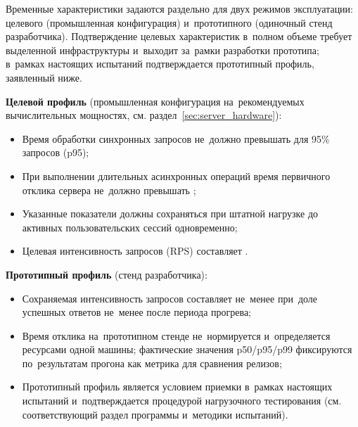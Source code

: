 \documentclass[12pt,a4paper]{extarticle}
\begin{document}
\begin{hseExample}
Временные характеристики задаются раздельно для двух режимов эксплуатации: целевого (промышленная конфигурация) и~прототипного (одиночный стенд разработчика). Подтверждение целевых характеристик в~полном объеме требует выделенной инфраструктуры и~выходит за~рамки разработки прототипа; в~рамках настоящих испытаний подтверждается прототипный профиль, заявленный ниже.

\textbf{Целевой профиль} (промышленная конфигурация на~рекомендуемых вычислительных мощностях, см. раздел~\ref{sec:server_hardware}):
\begin{itemize}[leftmargin=1.25cm]
    \item Время обработки синхронных запросов не~должно превышать  для 95\% запросов (p95);
    \item При выполнении длительных асинхронных операций время первичного отклика сервера не~должно превышать ;
    \item Указанные показатели должны сохраняться при штатной нагрузке до~ активных пользовательских сессий одновременно;
    \item Целевая интенсивность запросов (RPS) составляет .
\end{itemize}

\textbf{Прототипный профиль} (стенд разработчика):
\begin{itemize}[leftmargin=1.25cm]
    \item Сохраняемая интенсивность запросов составляет не~менее  при~доле успешных ответов не~менее  после периода прогрева;
    \item Время отклика на~прототипном стенде не~нормируется и~определяется ресурсами одной машины; фактические значения p50/p95/p99 фиксируются по~результатам прогона как метрика для сравнения релизов;
    \item Прототипный профиль является условием приемки в~рамках настоящих испытаний и~подтверждается процедурой нагрузочного тестирования (см. соответствующий раздел программы и~методики испытаний).
\end{itemize}
\end{hseExample}
\end{document}
